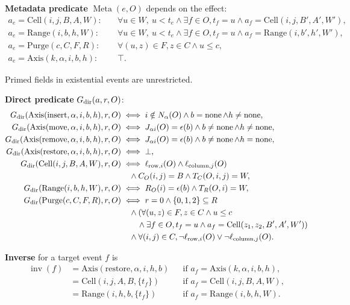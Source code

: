 \textbf{Metadata predicate} $\operatorname{Meta}(e,O)$ depends on the effect:
\[
\begin{aligned}a_e=\mathrm{Cell}(i,j,B,A,W):\quad&\forall u\in W,\ u<t_e\land\exists f\in O,t_f=u\land a_f=\mathrm{Cell}(i,j,B',A',W'),\\a_e=\mathrm{Range}(i,b,h,W):\quad&\forall u\in W,\ u<t_e\land\exists f\in O,t_f=u\land a_f=\mathrm{Range}(i,b',h',W'),\\a_e=\mathrm{Purge}(c,C,F,R):\quad&\forall(u,z)\in F,z\in C\land u\le c,\\a_e=\mathrm{Axis}(k,\alpha,i,b,h):\quad&\top.\end{aligned}
\]

Primed fields in existential events are unrestricted.

\textbf{Direct predicate} $G_{\rm dir}(a,r,O)$:
\[
\begin{aligned}G_{\rm dir}(\mathrm{Axis}(\mathrm{insert},\alpha,i,b,h),r,O)&\iff i\notin N_\alpha(O)\land b=\operatorname{none}\land h\ne\operatorname{none},\\G_{\rm dir}(\mathrm{Axis}(\mathrm{move},\alpha,i,b,h),r,O)&\iff J_{\alpha i}(O)=\epsilon(b)\land b\ne\operatorname{none}\land h\ne\operatorname{none},\\G_{\rm dir}(\mathrm{Axis}(\mathrm{remove},\alpha,i,b,h),r,O)&\iff J_{\alpha i}(O)=\epsilon(b)\land b\ne\operatorname{none}\land h=\operatorname{none},\\G_{\rm dir}(\mathrm{Axis}(\mathrm{restore},\alpha,i,b,h),r,O)&\iff\bot,\\G_{\rm dir}(\mathrm{Cell}(i,j,B,A,W),r,O)&\iff\ell_{\mathrm{row},i}(O)\land\ell_{\mathrm{column},j}(O)\\&\quad\land C_O(i,j)=B\land T_C(O,i,j)=W,\\G_{\rm dir}(\mathrm{Range}(i,b,h,W),r,O)&\iff R_O(i)=\epsilon(b)\land T_R(O,i)=W,\\G_{\rm dir}(\mathrm{Purge}(c,C,F,R),r,O)&\iff r=0\land\{0,1,2\}\subseteq R\\&\quad\land(\forall(u,z)\in F,z\in C\land u\le c\\&\qquad\land\exists f\in O,t_f=u\land a_f=\mathrm{Cell}(z_1,z_2,B',A',W'))\\&\quad\land\forall(i,j)\in C,\neg\ell_{\mathrm{row},i}(O)\lor\neg\ell_{\mathrm{column},j}(O).\end{aligned}
\]

\textbf{Inverse} for a target event $f$ is
\[
\begin{aligned}\operatorname{inv}(f)&=\mathrm{Axis}(\mathrm{restore},\alpha,i,h,b)&&\text{if }a_f=\mathrm{Axis}(k,\alpha,i,b,h),\\&=\mathrm{Cell}(i,j,A,B,\{t_f\})&&\text{if }a_f=\mathrm{Cell}(i,j,B,A,W),\\&=\mathrm{Range}(i,h,b,\{t_f\})&&\text{if }a_f=\mathrm{Range}(i,b,h,W).\end{aligned}
\]

